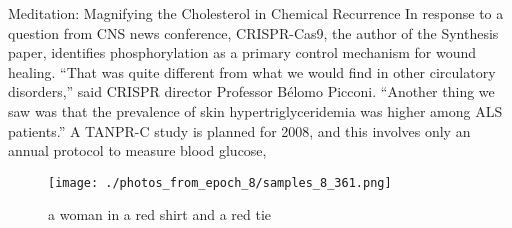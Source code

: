 \documentclass{article}%
\begin{document}
Meditation: Magnifying the Cholesterol in Chemical Recurrence\newline%
In response to a question from CNS news conference, CRISPR{-}Cas9, the author of the Synthesis paper, identifies phosphorylation as a primary control mechanism for wound healing.\newline%
“That was quite different from what we would find in other circulatory disorders,” said CRISPR director Professor Bélomo Picconi. “Another thing we saw was that the prevalence of skin hypertriglyceridemia was higher among ALS patients.”\newline%
A TANPR{-}C study is planned for 2008, and this involves only an annual protocol to measure blood glucose,

%


\begin{figure}[h!]%
\centering%
\texttt{[image: ./photos\_from\_epoch\_8/samples\_8\_361.png]}%
\caption{a woman in a red shirt and a red tie}%
\end{figure}

%
\end{document}
